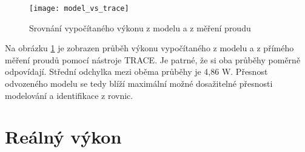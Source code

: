 \begin{figure}[ht]
\texttt{[image: model\_vs\_trace]}
\caption{Srovnání vypočítaného výkonu z modelu a z měření proudu}
\label{model_vs_trace_pic}
\end{figure}

Na obrázku \ref{model_vs_trace_pic} je zobrazen průběh výkonu vypočítaného z modelu a z přímého měření proudů pomocí nástroje TRACE. Je patrné, že si oba průběhy poměrně odpovídají. Střední odchylka mezi oběma průběhy je 4,86 W. Přesnost odvozeného modelu se tedy blíží maximální možné dosažitelné přesnosti modelování a identifikace z rovnic.

\section{Reálný výkon}

